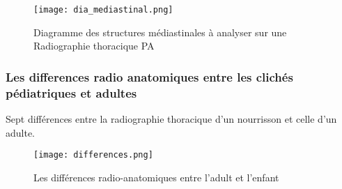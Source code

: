             \begin{figure}[H]
                \centering
                \texttt{[image: dia\_mediastinal.png]}
                \caption{Diagramme des structures médiastinales à analyser sur une Radiographie thoracique PA}\label{fig:mediastinal}
            \end{figure}
            \subsubsection{Les differences radio anatomiques entre les clichés pédiatriques et adultes}

            Sept différences entre la radiographie thoracique d'un nourrisson et celle d'un adulte.

            \begin{figure}[H]
                \centering
                \texttt{[image: differences.png]}
                \caption{Les différences radio-anatomiques entre l’adult et l’enfant}\label{fig:differences}
            \end{figure}

